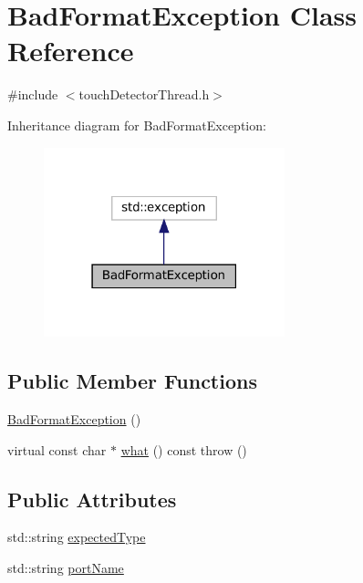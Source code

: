 \hypertarget{classBadFormatException}{}\section{Bad\+Format\+Exception Class Reference}
\label{classBadFormatException}


{\ttfamily \#include $<$touch\+Detector\+Thread.\+h$>$}



Inheritance diagram for Bad\+Format\+Exception\+:
\nopagebreak
\begin{figure}[H]
\begin{center}
\leavevmode
\includegraphics[width=198pt]{classBadFormatException__inherit__graph}
\end{center}
\end{figure}
\subsection*{Public Member Functions}
\begin{DoxyCompactItemize}
\item 
\hyperlink{classBadFormatException_a62651b0b36083b83c2976109b4741a24}{Bad\+Format\+Exception} ()
\item 
virtual const char $\ast$ \hyperlink{classBadFormatException_aeec1c6ac4cbdf5a8623d566efb5d3077}{what} () const  throw ()
\end{DoxyCompactItemize}
\subsection*{Public Attributes}
\begin{DoxyCompactItemize}
\item 
std\+::string \hyperlink{classBadFormatException_ac7be97af06e47ba6396c68c21fe3f597}{expected\+Type}
\item 
std\+::string \hyperlink{classBadFormatException_a25ca089d2a0981d4a549eefd0502524d}{port\+Name}
\end{DoxyCompactItemize}


